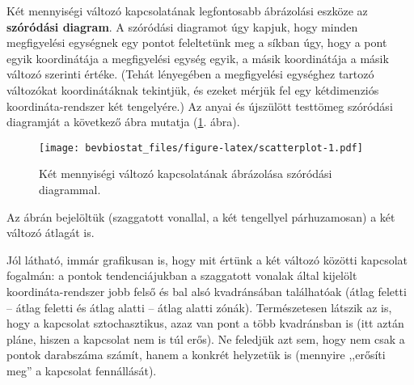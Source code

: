 \documentclass[]{book}
\newenvironment{Shaded}{\begin{snugshade}}{\end{snugshade}}
\newcommand{\KeywordTok}[1]{\textcolor[rgb]{0.13,0.29,0.53}{\textbf{#1}}}
\newcommand{\DataTypeTok}[1]{\textcolor[rgb]{0.13,0.29,0.53}{#1}}
\newcommand{\StringTok}[1]{\textcolor[rgb]{0.31,0.60,0.02}{#1}}
\newcommand{\OperatorTok}[1]{\textcolor[rgb]{0.81,0.36,0.00}{\textbf{#1}}}
\newcommand{\NormalTok}[1]{#1}
\begin{document}
Két mennyiségi változó kapcsolatának legfontosabb ábrázolási eszköze az
\textbf{szóródási diagram}. A szóródási diagramot úgy kapjuk, hogy
minden megfigyelési egységnek egy pontot feleltetünk meg a síkban úgy,
hogy a pont egyik koordinátája a megfigyelési egység egyik, a másik
koordinátája a másik változó szerinti értéke. (Tehát lényegében a
megfigyelési egységhez tartozó változókat koordinátáknak tekintjük, és
ezeket mérjük fel egy kétdimenziós koordináta-rendszer két tengelyére.)
Az anyai és újszülött testtömeg szóródási diagramját a következő ábra
mutatja (\ref{fig:scatterplot}. ábra).

\begin{Shaded}
\end{Shaded}

\begin{figure}
\centering
\texttt{[image: bevbiostat\_files/figure-latex/scatterplot-1.pdf]}
\caption{\label{fig:scatterplot}Két mennyiségi változó kapcsolatának
ábrázolása szóródási diagrammal.}
\end{figure}

Az ábrán bejelöltük (szaggatott vonallal, a két tengellyel párhuzamosan)
a két változó átlagát is.

Jól látható, immár grafikusan is, hogy mit értünk a két változó közötti
kapcsolat fogalmán: a pontok tendenciájukban a szaggatott vonalak által
kijelölt koordináta-rendszer jobb felső és bal alsó kvadránsában
találhatóak (átlag feletti -- átlag feletti és átlag alatti -- átlag
alatti zónák). Természetesen látszik az is, hogy a kapcsolat
sztochasztikus, azaz van pont a több kvadránsban is (itt aztán pláne,
hiszen a kapcsolat nem is túl erős). Ne feledjük azt sem, hogy nem csak
a pontok darabszáma számít, hanem a konkrét helyzetük is (mennyire
,,erősíti meg'' a kapcsolat fennállását).
\end{document}
